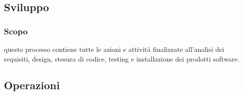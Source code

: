 \subsection{Sviluppo}
\subsubsection{Scopo} questo processo contiene tutte le azioni e attività finalizzate all'analisi dei requisiti, design, stesura di codice, testing e installazione dei prodotti software. 
\subsection{Operazioni}


